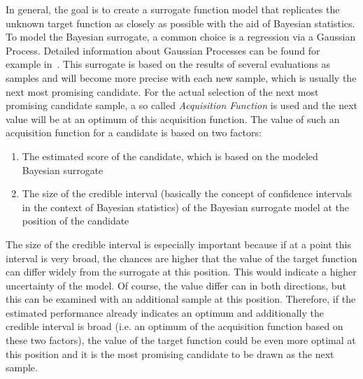 In general, the goal is to create a surrogate function model that replicates the unknown target function as closely as possible with the aid of Bayesian statistics.
To model the Bayesian surrogate, a common choice is a regression via a Gaussian Process.
Detailed information about Gaussian Processes can be found for example in~\cite{Rasmussen-Gaussian-Processes}.\newline
This surrogate is based on the results of several evaluations as samples and will become more precise with each new sample, which is usually the next most promising candidate.
For the actual selection of the next most promising candidate sample, a so called \textit{Acquisition Function} is used and the next value will be at an optimum of this acquisition function.
The value of such an acquisition function for a candidate is based on two factors:
\begin{enumerate}
    \item The estimated score of the candidate, which is based on the modeled Bayesian surrogate
    \item The size of the credible interval (basically the concept of confidence intervals in the context of Bayesian statistics) of the Bayesian surrogate model at the position of the candidate
\end{enumerate}
The size of the credible interval is especially important because if at a point this interval is very broad, the chances are higher that the value of the target function can differ widely from the surrogate at this position.
This would indicate a higher uncertainty of the model.
Of course, the value differ can in both directions, but this can be examined with an additional sample at this position.
Therefore, if the estimated performance already indicates an optimum and additionally the credible interval is broad (i.e. an optimum of the acquisition function based on these two factors), the value of the target function could be even more optimal at this position and it is the most promising candidate to be drawn as the next sample.

